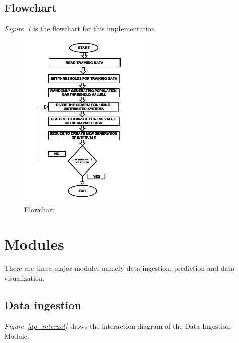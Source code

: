 \documentclass[12pt,journal,compsoc]{IEEEtran}
\begin{document}
\subsection{Flowchart}
\emph{Figure~\ref{flowchart}} is the flowchart for this implementation
\begin{figure}
\includegraphics[width=2.5in]{flowchart}
\caption{Flowchart}
\label{flowchart}
\end{figure}

\section{Modules}
\indent There are three major modules namely data ingestion, prediction and data visualization.

\subsection{Data ingestion}
\emph{Figure~\ref{dp_interact}} shows the interaction diagram of the Data Ingestion Module.
\end{document}
